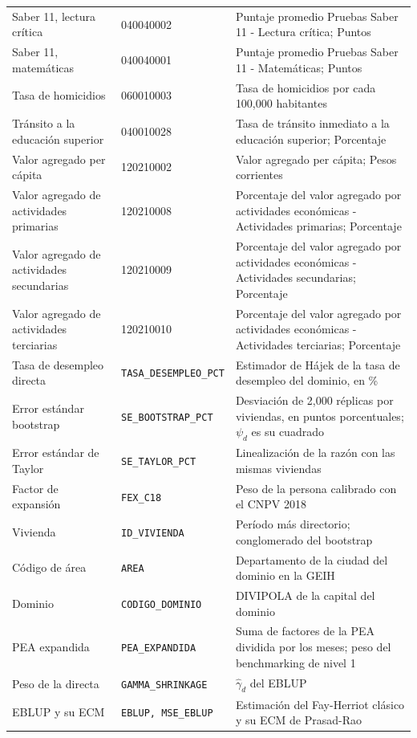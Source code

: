 {\begin{longtable}{p{3.5cm} p{3.5cm} p{5.7cm}}
Saber 11, lectura crítica & 040040002 & Puntaje promedio Pruebas Saber 11 - Lectura crítica; Puntos \\
Saber 11, matemáticas & 040040001 & Puntaje promedio Pruebas Saber 11 - Matemáticas; Puntos \\
Tasa de homicidios & 060010003 & Tasa de homicidios por cada 100,000 habitantes \\
Tránsito a la educación superior & 040010028 & Tasa de tránsito inmediato a la educación superior; Porcentaje \\
Valor agregado per cápita & 120210002 & Valor agregado per cápita; Pesos corrientes \\
Valor agregado de actividades primarias & 120210008 & Porcentaje del valor agregado por actividades económicas - Actividades primarias; Porcentaje \\
Valor agregado de actividades secundarias & 120210009 & Porcentaje del valor agregado por actividades económicas - Actividades secundarias; Porcentaje \\
Valor agregado de actividades terciarias & 120210010 & Porcentaje del valor agregado por actividades económicas - Actividades terciarias; Porcentaje \\
\midrule
Tasa de desempleo directa & \texttt{TASA\_DESEMPLEO\_PCT} & Estimador de Hájek de la tasa de desempleo del dominio, en \% \\
Error estándar bootstrap & \texttt{SE\_BOOTSTRAP\_PCT} & Desviación de 2,000 réplicas por viviendas, en puntos porcentuales; $\psi_d$ es su cuadrado \\
Error estándar de Taylor & \texttt{SE\_TAYLOR\_PCT} & Linealización de la razón con las mismas viviendas \\
Factor de expansión & \texttt{FEX\_C18} & Peso de la persona calibrado con el CNPV 2018 \\
Vivienda & \texttt{ID\_VIVIENDA} & Período más directorio; conglomerado del bootstrap \\
Código de área & \texttt{AREA} & Departamento de la ciudad del dominio en la GEIH \\
Dominio & \texttt{CODIGO\_DOMINIO} & DIVIPOLA de la capital del dominio \\
PEA expandida & \texttt{PEA\_EXPANDIDA} & Suma de factores de la PEA dividida por los meses; peso del benchmarking de nivel 1 \\
Peso de la directa & \texttt{GAMMA\_SHRINKAGE} & $\hat{\gamma}_d$ del EBLUP \\
EBLUP y su ECM & \texttt{EBLUP, MSE\_EBLUP} & Estimación del Fay-Herriot clásico y su ECM de Prasad-Rao \\

\end{longtable}}
